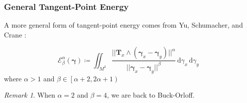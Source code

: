 \documentclass{beamer}
\theoremstyle{remark}
\newtheorem{remark}{Remark}
\newcommand{\gammabf}{\boldsymbol{\gamma}}
\newcommand{\intd}{\, \text{d}}
\newcommand{\norm}[1]{\lvert \lvert #1 \rvert \rvert}
\begin{document}
\begin{frame}
    \frametitle{General Tangent-Point Energy}
    A more general form of tangent-point energy comes from Yu, Schumacher, and Crane \cite{YSC2021}:
    \begin{definition}
        \begin{equation*}
            \mathcal{E}_{\beta}^{\alpha} \left( \gammabf \right) \coloneqq
            \iint_{M^2} \frac{\norm{\mathbf{T}_x \wedge \left( \gammabf_x - \gammabf_y \right)}^{\alpha}}{\norm{\gammabf_x - \gammabf_y}^{\beta}}
            \intd \gamma_x \intd \gamma_y
        \end{equation*}
        where $\alpha > 1$ and $\beta \in \left[ \alpha+2, 2\alpha+1 \right)$
    \end{definition}
    \begin{remark}
        When $\alpha = 2$ and $\beta = 4$, we are back to Buck-Orloff.
    \end{remark}
\end{frame}
\end{document}

